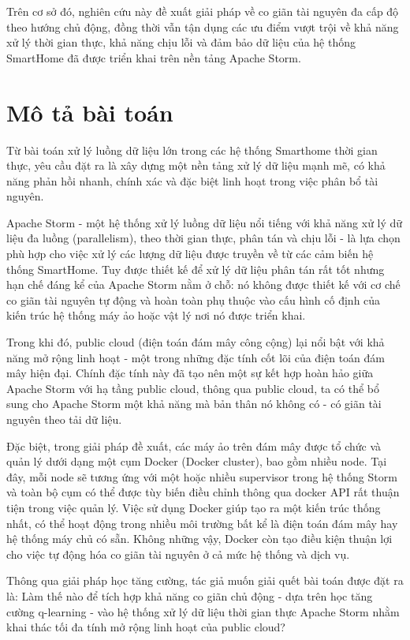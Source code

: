 Trên cơ sở đó, nghiên cứu này đề xuất giải pháp về co giãn tài nguyên đa cấp độ theo hướng chủ động, đồng thời vẫn tận dụng các ưu điểm vượt trội về khả năng xử lý thời gian thực, khả năng chịu lỗi và đảm bảo dữ liệu của hệ thống SmartHome đã được triển khai trên nền tảng Apache Storm.

\section{Mô tả bài toán}

Từ bài toán xử lý luồng dữ liệu lớn trong các hệ thống Smarthome thời gian thực, yêu cầu đặt ra là xây dựng một nền tảng xử lý dữ liệu mạnh mẽ, có khả năng phản hồi nhanh, chính xác và đặc biệt linh hoạt trong việc phân bổ tài nguyên.

Apache Storm - một hệ thống xử lý luồng dữ liệu nổi tiếng với khả năng xử lý dữ liệu đa luồng (parallelism), theo thời gian thực, phân tán và chịu lỗi - là lựa chọn phù hợp cho việc xử lý các lượng dữ liệu được truyền về từ các cảm biến hệ thống SmartHome. Tuy được thiết kế để xử lý dữ liệu phân tán rất tốt nhưng hạn chế đáng kể của Apache Storm nằm ở chỗ: nó không được thiết kế với cơ chế co giãn tài nguyên tự động và hoàn toàn phụ thuộc vào cấu hình cố định của kiến trúc hệ thống máy ảo hoặc vật lý nơi nó được triển khai.

Trong khi đó, public cloud (điện toán đám mây công cộng) lại nổi bật với khả năng mở rộng linh hoạt - một trong những đặc tính cốt lõi của điện toán đám mây hiện đại. Chính đặc tính này đã tạo nên một sự kết hợp hoàn hảo giữa Apache Storm với hạ tầng public cloud, thông qua public cloud, ta có thể bổ sung cho Apache Storm một khả năng mà bản thân nó không có - có giãn tài nguyên theo tải dữ liệu.

Đặc biệt, trong giải pháp đề xuất, các máy ảo trên đám mây được tổ chức và quản lý dưới dạng một cụm Docker (Docker cluster), bao gồm nhiều node. Tại đây, mỗi node sẽ tương ứng với một hoặc nhiều supervisor trong hệ thống Storm và toàn bộ cụm có thể được tùy biến điều chỉnh thông qua docker API rất thuận tiện trong việc quản lý. Việc sử dụng Docker giúp tạo ra một kiến trúc thống nhất, có thể hoạt động trong nhiều môi trường bất kể là điện toán đám mây hay hệ thống máy chủ có sẵn. Không những vậy, Docker còn tạo điều kiện thuận lợi cho việc tự động hóa co giãn tài nguyên ở cả mức hệ thống và dịch vụ.

Thông qua giải pháp học tăng cường, tác giả muốn giải quết bài toán được đặt ra là: Làm thế nào để tích hợp khả năng co giãn chủ động - dựa trên học tăng cường q-learning - vào hệ thống xử lý dữ liệu thời gian thực Apache Storm nhằm khai thác tối đa tính mở rộng linh hoạt của public cloud?

